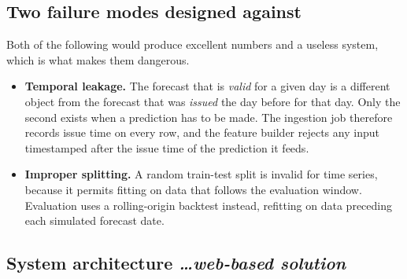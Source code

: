 \documentclass[11pt,a4paper]{article}
\newcommand{\BvrHint}[1]{%
  {\normalfont\normalsize\itshape\hfill #1}}
\begin{document}
\subsection{Two failure modes designed against}
Both of the following would produce excellent numbers
and a useless system, which is what makes them
dangerous.

\begin{itemize}[leftmargin=0.7cm]
  \item \textbf{Temporal leakage.} The forecast that is
    \emph{valid} for a given day is a different object
    from the forecast that was \emph{issued} the day
    before for that day. Only the second exists when a
    prediction has to be made. The ingestion job
    therefore records issue time on every row, and the
    feature builder rejects any input timestamped after
    the issue time of the prediction it feeds.
  \item \textbf{Improper splitting.} A random train-test
    split is invalid for time series, because it permits
    fitting on data that follows the evaluation window.
    Evaluation uses a rolling-origin backtest instead,
    refitting on data preceding each simulated forecast
    date.
\end{itemize}

\subsection{System architecture %
\BvrHint{\ldots web-based solution}}

\begin{center}
\end{center}
\end{document}
